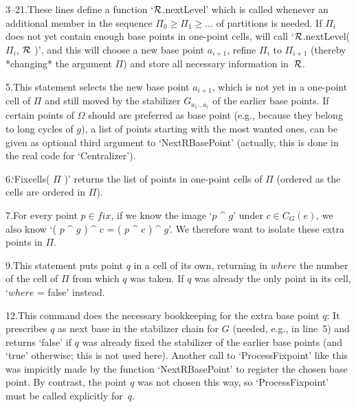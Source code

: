 3--21.\enspace  These lines define  a function `$\cal R$.nextLevel' which
is called whenever an additional member in the  sequence $\Pi_0 \ge \Pi_1
\ge\ldots$  of  partitions is  needed.  If  $\Pi_i$ does not  yet contain
enough  base     points in one-point  cells,     {\GAP} will  call `$\cal
R$.nextLevel( $\Pi_i$, $\cal R$ )', and this will choose a new base point
$a_{i+1}$, refine $\Pi_i$ to $\Pi_{i+1}$ (thereby *changing* the argument
$\Pi$) and store all necessary information in~$\cal R$.

5.\enspace This statement selects the new  base point $a_{i+1}$, which is
not yet  in a one-point  cell of $\Pi$ and still  moved by the stabilizer
$G_{a_1\ldots  a_i}$ of  the earlier base  points.  If certain  points of
$\Omega$ should are preferred as base point (e.g., because they belong to
long cycles of $g$), a list of points starting with the most wanted ones,
can be given  as optional third  argument  to `NextRBasePoint' (actually,
this is done in the real code for `Centralizer').

6.\enspace  `Fixcells( $\Pi$ )' returns the  list of  points in one-point
cells of $\Pi$ (ordered as the cells are ordered in $\Pi$).

7.\enspace For every point $p\in fix$,  if we know the  image `$p$ ^ $g$'
under $c\in C_G(e)$, we also know `( $p$ ^ $g$ ) ^ $c$ = (  $p$ ^ $c$ ) ^
$g$'. We therefore want to isolate these extra points in $\Pi$.

9.\enspace This statement puts point $q$ in a cell  of its own, returning
in $where$ the number of the cell  of $\Pi$ from  which $q$ was taken. If
$q$ was already the only point in its cell, `$where$ = false' instead.

12.\enspace This  command does the   necessary bookkeeping for  the extra
base point $q$:  It prescribes $q$ as next  base in the  stabilizer chain
for $G$ (needed, e.g., in line~5) and  returns `false' if $q$ was already
fixed the  stabilizer of the  earlier base points (and  `true' otherwise;
this is not used here).  Another call to  `ProcessFixpoint' like this was
impicitly  made by the  function  `NextRBasePoint' to register the chosen
base  point. By contrast,  the  point $q$  was  not chosen  this  way, so
`ProcessFixpoint' must be called explicitly for~$q$.

